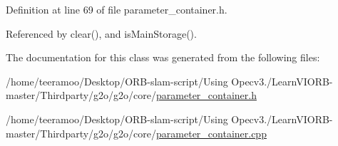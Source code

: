 Definition at line 69 of file parameter\+\_\+container.\+h.



Referenced by clear(), and is\+Main\+Storage().



The documentation for this class was generated from the following files\+:\begin{DoxyCompactItemize}
\item 
/home/teeramoo/\+Desktop/\+O\+R\+B-\/slam-\/script/\+Using Opecv3./\+Learn\+V\+I\+O\+R\+B-\/master/\+Thirdparty/g2o/g2o/core/\hyperlink{parameter__container_8h}{parameter\+\_\+container.\+h}\item 
/home/teeramoo/\+Desktop/\+O\+R\+B-\/slam-\/script/\+Using Opecv3./\+Learn\+V\+I\+O\+R\+B-\/master/\+Thirdparty/g2o/g2o/core/\hyperlink{parameter__container_8cpp}{parameter\+\_\+container.\+cpp}\end{DoxyCompactItemize}
